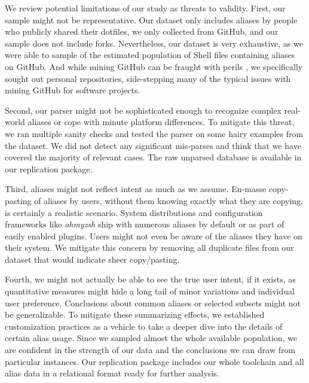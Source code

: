 \documentclass[smallextended,natbib]{svjour3}
\newcommand{\per}[1]{\numprint[\%]{#1}}
\begin{document}
We review potential limitations of our study as threats to validity.
First, our sample might not be representative.
Our dataset only includes aliases by people who publicly shared their dotfiles, we only collected from GitHub, and our sample does not include forks.
Nevertheless, our dataset is very exhaustive, as we were able to sample \per{94.09} of the estimated population of Shell files containing aliases on GitHub.
And while mining GitHub can be fraught with perils \citep{kalliamvakou:14}, we specifically sought out personal repositories, side-stepping many of the typical issues with mining GitHub for software projects.

Second, our parser might not be sophisticated enough to recognize complex real-world aliases or cope with minute platform differences.
To mitigate this threat, we ran multiple sanity checks and tested the parser on some hairy examples from the dataset.
We did not detect any significant mis-parses and think that we have covered the majority of relevant cases.
The raw unparsed database is available in our replication package.

Third, aliases might not reflect intent as much as we assume.
En-masse copy-pasting of aliases by users, without them knowing exactly what they are copying, is certainly a realistic scenario.
System distributions and configuration frameworks like \emph{ohmyzsh} ship with numerous aliases by default or as part of easily enabled plugins.
Users might not even be aware of the aliases they have on their system.
We mitigate this concern by removing all duplicate files from our dataset that would indicate sheer copy/pasting.

Fourth, we might not actually be able to see the true user intent, if it exists, as quantitative measures might hide a long tail of minor variations and individual user preference.
Conclusions about common aliases or selected subsets might not be generalizable.
To mitigate these summarizing effects, we established customization practices as a vehicle to take a deeper dive into the details of certain alias usage.
Since we sampled almost the whole available population, we are confident in the strength of our data and the conclusions we can draw from particular instances.
Our replication package includes our whole toolchain and all alias data in a relational format ready for further analysis.
\end{document}
